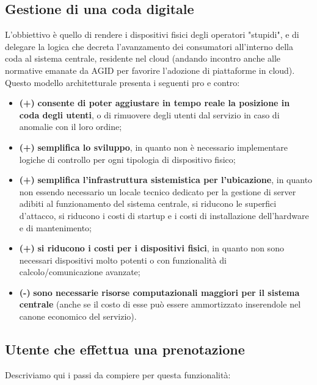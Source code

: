 \documentclass[a4paper, titlepage, 12pt, openright, twoside]{book}
\begin{document}
\subsection{Gestione di una coda digitale}
L'obbiettivo è quello di rendere i dispositivi fisici degli operatori "stupidi", e di delegare la logica che decreta l'avanzamento dei consumatori all'interno della coda al sistema centrale, residente nel cloud (andando incontro anche alle normative emanate da AGID per favorire l'adozione di piattaforme in cloud).
Questo modello architetturale presenta i seguenti pro e contro:
\begin{itemize}
	\item \textbf{(+)} \textbf{consente di poter aggiustare in tempo reale la posizione in coda degli utenti}, o di rimuovere degli utenti dal servizio in caso di anomalie con il loro 						ordine;
	\item \textbf{(+)} \textbf{semplifica lo sviluppo}, in quanto non è necessario implementare logiche di controllo per ogni tipologia di dispositivo fisico;
	\item \textbf{(+)} \textbf{semplifica l'infrastruttura sistemistica per l'ubicazione}, in quanto non essendo necessario un locale tecnico dedicato per la gestione di server adibiti al funzionamento del sistema centrale, si riducono le superfici d'attacco, si riducono i costi di startup e i costi di installazione dell'hardware e di mantenimento;
	\item \textbf{(+)} \textbf{si riducono i costi per i dispositivi fisici}, in quanto non sono necessari dispositivi molto potenti o con funzionalità di calcolo/comunicazione avanzate;
	\item \textbf{(-)} \textbf{sono necessarie risorse computazionali maggiori per il sistema centrale} (anche se il costo di esse può essere ammortizzato inserendole nel canone economico del servizio).
\end{itemize}

\subsection{Utente che effettua una prenotazione}

Descriviamo qui i passi da compiere per questa funzionalità:
\end{document}

